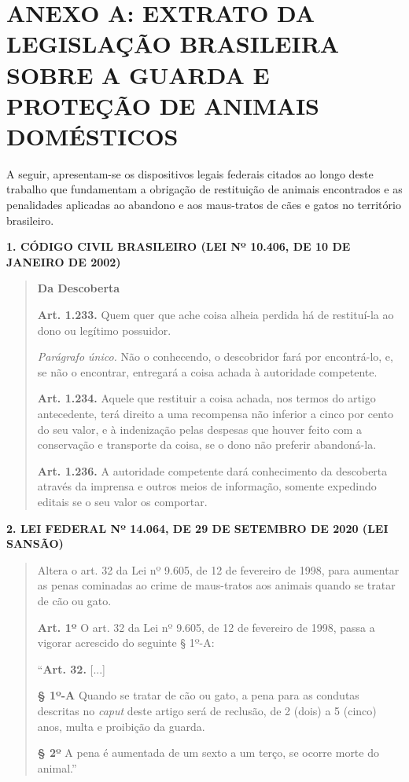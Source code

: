 \section*{ANEXO A: EXTRATO DA LEGISLAÇÃO BRASILEIRA SOBRE A GUARDA E PROTEÇÃO DE ANIMAIS DOMÉSTICOS}

A seguir, apresentam-se os dispositivos legais federais citados ao longo deste trabalho que fundamentam a obrigação de restituição de animais encontrados e as penalidades aplicadas ao abandono e aos maus-tratos de cães e gatos no território brasileiro.

\vspace{0.5cm}
\noindent
\textbf{1. CÓDIGO CIVIL BRASILEIRO (LEI Nº 10.406, DE 10 DE JANEIRO DE 2002)}
\vspace{0.2cm}

\begin{quote}
\small
\textbf{Da Descoberta}

\textbf{Art. 1.233.} Quem quer que ache coisa alheia perdida há de restituí-la ao dono ou legítimo possuidor.
\par
\textit{Parágrafo único.} Não o conhecendo, o descobridor fará por encontrá-lo, e, se não o encontrar, entregará a coisa achada à autoridade competente.

\textbf{Art. 1.234.} Aquele que restituir a coisa achada, nos termos do artigo antecedente, terá direito a uma recompensa não inferior a cinco por cento do seu valor, e à indenização pelas despesas que houver feito com a conservação e transporte da coisa, se o dono não preferir abandoná-la.

\textbf{Art. 1.236.} A autoridade competente dará conhecimento da descoberta através da imprensa e outros meios de informação, somente expedindo editais se o seu valor os comportar.
\end{quote}

\vspace{0.5cm}
\noindent
\textbf{2. LEI FEDERAL Nº 14.064, DE 29 DE SETEMBRO DE 2020 (LEI SANSÃO)}
\vspace{0.2cm}

\begin{quote}
\small
Altera o art. 32 da Lei nº 9.605, de 12 de fevereiro de 1998, para aumentar as penas cominadas ao crime de maus-tratos aos animais quando se tratar de cão ou gato.

\textbf{Art. 1º} O art. 32 da Lei nº 9.605, de 12 de fevereiro de 1998, passa a vigorar acrescido do seguinte § 1º-A:

``\textbf{Art. 32.} [...]
\par
\textbf{§ 1º-A} Quando se tratar de cão ou gato, a pena para as condutas descritas no \textit{caput} deste artigo será de reclusão, de 2 (dois) a 5 (cinco) anos, multa e proibição da guarda.
\par
\textbf{§ 2º} A pena é aumentada de um sexto a um terço, se ocorre morte do animal.''
\end{quote}

